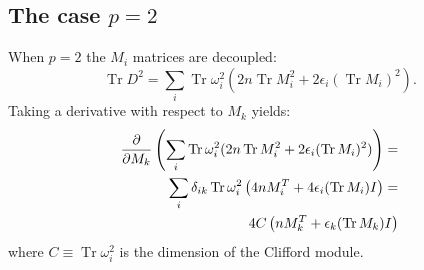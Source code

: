 \documentclass[12pt,a4paper]{article}
\DeclareMathOperator{\Tr}{Tr}
\begin{document}
\subsection{The case $p=2$}
When $p = 2$ the $M_i$ matrices are decoupled:
\begin{equation}
\Tr D^2 = \sum_i \Tr \omega_i^2 (2 n \Tr M_i^2 + 2 \epsilon_i (\Tr M_i)^2).
\end{equation} 
Taking a derivative with respect to $M_k$ yields:
\begin{align}\label{eq:As}
\frac{\partial}{\partial M_k} \left( \sum_i \Tr \omega_i^2 (2 n \Tr M_i^2 + 2 \epsilon_i (\Tr M_i)^2) \right) = \notag \\
\sum_i \delta_{ik} \Tr \omega_i^2 \left( 4 n M_i^T + 4 \epsilon_i (\Tr M_i) I \right) = \notag \\
4 C \left( n M_k^T + \epsilon_k (\Tr M_k) I \right)
\end{align}
where $C \equiv \Tr \omega_i^2$ is the dimension of the Clifford module.
\end{document}
